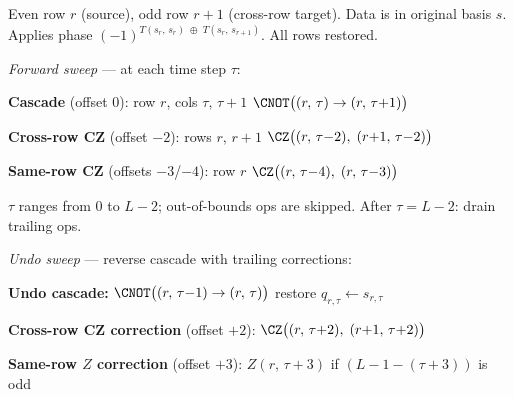 \begin{algorithm}[t]
\caption{\textsc{PipelineSameCross}: same-row $T(x,x)$ + cross-row $T(x,y)$ in one sweep}
\label{alg:pipeline-b}
\begin{algorithmic}[1]
\Input Even row $r$ (source), odd row $r{+}1$ (cross-row target).
  Data is in original basis $s$.
\Output Applies phase $(-1)^{T(s_r,\,s_r) \;\oplus\; T(s_r,\,s_{r+1})}$.
  All rows restored.

\Statex
\Statex \emph{Forward sweep} --- at each time step $\tau$:

\Statex \hspace{2em}\textbf{Cascade} (offset 0): \hfill row $r$, cols $\tau{,}\,\tau{+}1$
\State \hspace{3em}$\CNOT\bigl((r,\,\tau) \to (r,\,\tau{+}1)\bigr)$

\Statex \hspace{2em}\textbf{Cross-row CZ} (offset $-2$): \hfill rows $r{,}\,r{+}1$
\State \hspace{3em}$\CZ\bigl((r,\,\tau{-}2),\;(r{+}1,\,\tau{-}2)\bigr)$

\Statex \hspace{2em}\textbf{Same-row CZ} (offsets $-3$/$-4$): \hfill row $r$
\State \hspace{3em}$\CZ\bigl((r,\,\tau{-}4),\;(r,\,\tau{-}3)\bigr)$

\Statex
\State $\tau$ ranges from $0$ to $L{-}2$; out-of-bounds ops are skipped.
\State After $\tau = L{-}2$: drain trailing ops.

\Statex
\Statex \emph{Undo sweep} --- reverse cascade with trailing corrections:

\Statex \hspace{2em}\textbf{Undo cascade:}
  $\CNOT\bigl((r,\,\tau{-}1) \to (r,\,\tau)\bigr)$
  \hfill restore $q_{r,\tau} \gets s_{r,\tau}$

\Statex \hspace{2em}\textbf{Cross-row CZ correction} (offset $+2$):
  $\CZ\bigl((r,\,\tau{+}2),\;(r{+}1,\,\tau{+}2)\bigr)$

\Statex \hspace{2em}\textbf{Same-row $Z$ correction} (offset $+3$):
  $Z(r,\,\tau{+}3)$ if $(L{-}1{-}(\tau{+}3))$ is odd
\end{algorithmic}
\end{algorithm}


